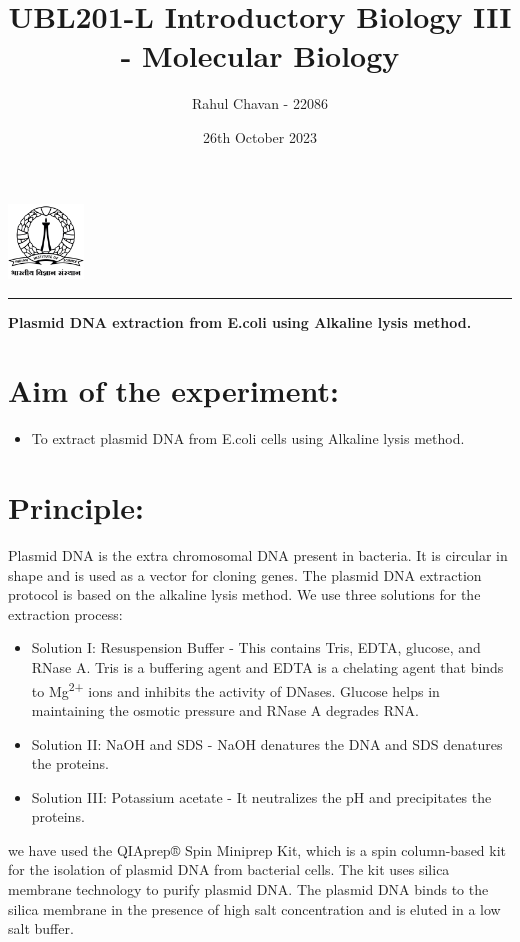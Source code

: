 \documentclass{report}
\title{\textbf{UBL201-L Introductory Biology III - Molecular Biology}}
\author{Rahul Chavan - 22086}
\date{26th October 2023}
\renewcommand{\maketitle}{
 \begin{center}
    \includegraphics[width=2cm]{IISc_Master_Seal_Black.jpg}
    \vspace{0.5cm}

    \Large
    \textbf{\thetitle}
    
    \vspace{0.5cm}
    
    \Large
    \theauthor
    
    \vspace{0.2cm}
    
    \large
    \thedate

    \vspace{0.5cm}

    \hrule  
    
  \end{center}
}
\begin{document}
\maketitle
\begin{center}
    \Large
    \textbf{Plasmid DNA extraction from E.coli using Alkaline lysis method.}
\end{center} 


\section*{Aim of the experiment:}
\begin{itemize}
  \item To extract plasmid DNA from E.coli cells using Alkaline lysis method.
\end{itemize}

\section*{Principle:}
Plasmid DNA is the extra chromosomal DNA present in bacteria. It is circular in shape and is used as a vector for cloning genes. 
The plasmid DNA extraction protocol is based on the alkaline lysis method. 
We use three solutions for the extraction process:
\begin{itemize}
  \item Solution I: Resuspension Buffer - This contains Tris, EDTA, glucose, and RNase A.
  Tris is a buffering agent and EDTA is a chelating agent that binds to Mg\textsuperscript{2+} ions and inhibits the activity of DNases.
  Glucose helps in maintaining the osmotic pressure and RNase A degrades RNA.
  \item Solution II: NaOH and SDS - NaOH denatures the DNA and SDS denatures the proteins.
  \item Solution III: Potassium acetate - It neutralizes the pH and precipitates the proteins.
\end{itemize}

we have used the QIAprep® Spin Miniprep Kit, which is a spin column-based kit for the isolation of plasmid DNA from bacterial cells.
The kit uses silica membrane technology to purify plasmid DNA.
The plasmid DNA binds to the silica membrane in the presence of high salt concentration and is eluted in a low salt buffer.
\end{document}
